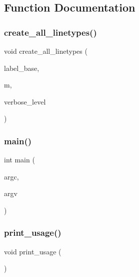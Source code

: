 \subsection{Function Documentation}
\mbox{\label{tdo__start_8_c_ac4959d0aafbf08044e020e1d09ce8d69}} 
\subsubsection{\texorpdfstring{create\+\_\+all\+\_\+linetypes()}{create\_all\_linetypes()}}
{\footnotesize\ttfamily void create\+\_\+all\+\_\+linetypes (\begin{DoxyParamCaption}\item[{\mbox{\hyperlink{galois_8h_ab6cc7b4aeb6ea31aba2b3fbfc83ff5e6}{B\+Y\+TE}} $\ast$}]{label\+\_\+base,  }\item[{\mbox{\hyperlink{galois_8h_a09fddde158a3a20bd2dcadb609de11dc}{I\+NT}}}]{m,  }\item[{\mbox{\hyperlink{galois_8h_a09fddde158a3a20bd2dcadb609de11dc}{I\+NT}}}]{verbose\+\_\+level }\end{DoxyParamCaption})}

\mbox{\label{tdo__start_8_c_a3c04138a5bfe5d72780bb7e82a18e627}} 
\subsubsection{\texorpdfstring{main()}{main()}}
{\footnotesize\ttfamily int main (\begin{DoxyParamCaption}\item[{int}]{argc,  }\item[{char $\ast$$\ast$}]{argv }\end{DoxyParamCaption})}

\mbox{\label{tdo__start_8_c_ae5ad5cbeccaedc03a48d3c7eaa803e79}} 
\subsubsection{\texorpdfstring{print\+\_\+usage()}{print\_usage()}}
{\footnotesize\ttfamily void print\+\_\+usage (\begin{DoxyParamCaption}{ }\end{DoxyParamCaption})}

